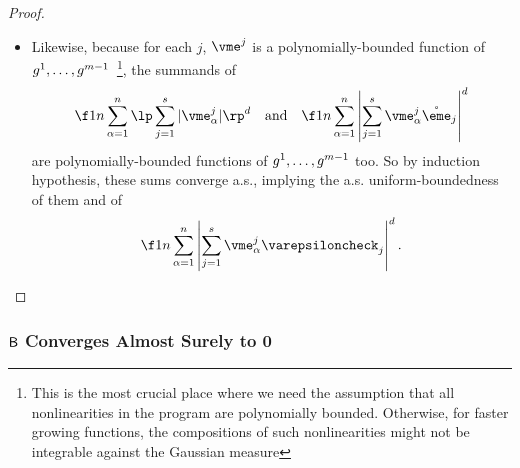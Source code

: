 \documentclass[main.tex]{subfiles}
\begin{document}
\begin{proof}
\begin{itemize}
          almost surely, for large enough $n$, $|\sum_{i=1}^r \xme_\alpha^i \varepsilonhat_i| \le \sum_{i=1}^r |\xme_\alpha^i|$ (again, the order of qualifier is very important here).
          By induction hypothesis,
          \begin{align*}
          \f 1 n \sum_{\alpha=1}^n
              \lp \sum_{i=1}^r |\xme_\alpha^i|\rp^d
          \end{align*}
          converges a.s.\ to a deterministic value, yielding the a.s.\ uniform-boundedness of it and of
          \begin{align*}
          \f 1 n \sum_{\alpha=1}^n
              \left| \sum_{i=1}^r \xme_\alpha^i \varepsilonhat_i \right|^d.
          \end{align*}
      \item
          Likewise, because for each $j$, $\vme^j$ is a polynomially-bounded function of $g^1, \ldots, g^{m-1}$\ \footnote{This is the most crucial place where we need the assumption that all nonlinearities in the program are polynomially bounded. Otherwise, for faster growing functions, the compositions of such nonlinearities might not be integrable against the Gaussian measure}, the summands of
          \begin{align*}
          \f 1 n \sum_{\alpha=1}^n
              \lp \sum_{j=1}^s |\vme_\alpha^j|\rp^d
          \quad\text{and}\quad
          \f 1 n \sum_{\alpha=1}^n
                      \left|
                          \sum_{j=1}^s
                          \vme_\alpha^j \mathring{\eme}_j
                      \right|^d
          \end{align*}
          are polynomially-bounded functions of $g^1, \ldots, g^{m-1}$ too.
          So by induction hypothesis, these sums converge a.s., implying the a.s. uniform-boundedness of them and of
          \begin{align*}
          \f 1 n \sum_{\alpha=1}^n
                      \left|
                          \sum_{j=1}^s
                          \vme_\alpha^j \varepsiloncheck_j
                      \right|^d
              .
         \end{align*}
  \end{itemize}
\end{proof}

\subsubsection{\texorpdfstring{$\mathsf{B}$}{B} Converges Almost Surely to 0}
\label{sec:probB}
\newcommand{\JJc}{J}
\newcommand{\JJ}{\bar{\JJc}}
\end{document}
